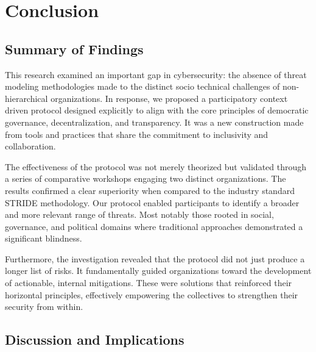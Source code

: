 
%

\chapter{Conclusion}
\label{cha:conclusion}

\glsresetall

\section{Summary of Findings}
\label{sec:summary-of-findings}

This research examined an important gap in cybersecurity: the
absence of threat modeling methodologies made to the distinct
socio technical challenges of non-hierarchical organizations. In response, we
proposed a participatory context driven protocol designed explicitly to
align with the core principles of democratic governance, decentralization, and
transparency. It was a new construction made from tools and practices that share
the commitment to inclusivity and collaboration.

The effectiveness of the protocol was not merely theorized but validated through
a series of comparative workshops engaging two distinct organizations. The
results confirmed a clear superiority when compared to the industry standard
STRIDE methodology. Our protocol enabled participants to identify a broader and
more relevant range of threats. Most notably those rooted in social,
governance, and political domains where traditional approaches
demonstrated a significant blindness.

Furthermore, the investigation revealed that the protocol did not just produce a
longer list of risks. It fundamentally guided organizations toward the
development of actionable, internal mitigations. These were solutions that
reinforced their horizontal principles, effectively
empowering the collectives to strengthen their security from within.

\section{Discussion and Implications}
\label{sec:discussion-and-implications}

